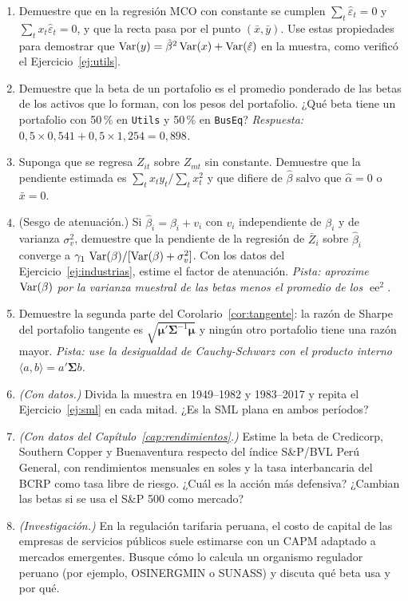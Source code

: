 \begin{enumerate}[label=\textbf{\thechapter.\arabic*},leftmargin=*,itemsep=6pt]
  \item Demuestre que en la regresión MCO con constante se cumplen $\sum_t\hat\varepsilon_t=0$ y
  $\sum_tx_t\hat\varepsilon_t=0$, y que la recta pasa por el punto $(\bar x,\bar y)$. Use estas propiedades
  para demostrar que $\operatorname{Var}(y)=\hat\beta^2\operatorname{Var}(x)+\operatorname{Var}(\hat\varepsilon)$ en la muestra, como verificó el
  Ejercicio~\ref{ej:utils}.

  \item Demuestre que la beta de un portafolio es el promedio ponderado de las betas de los activos que lo
  forman, con los pesos del portafolio. ¿Qué beta tiene un portafolio con 50\,\% en \texttt{Utils} y
  50\,\% en \texttt{BusEq}? \textit{Respuesta: $0{,}5\times0{,}541+0{,}5\times1{,}254=0{,}898$.}

  \item Suponga que se regresa $Z_{it}$ sobre $Z_{mt}$ sin constante. Demuestre que la pendiente estimada es
  $\sum_tx_ty_t/\sum_tx_t^2$ y que difiere de $\hat\beta$ salvo que $\hat\alpha=0$ o $\bar x=0$.

  \item (Sesgo de atenuación.) Si $\hat\beta_i=\beta_i+v_i$ con $v_i$ independiente de $\beta_i$ y de varianza
  $\sigma^2_v$, demuestre que la pendiente de la regresión de $\bar Z_i$ sobre $\hat\beta_i$ converge a
  $\gamma_1\,\operatorname{Var}(\beta)/[\operatorname{Var}(\beta)+\sigma^2_v]$. Con los datos del Ejercicio~\ref{ej:industrias},
  estime el factor de atenuación. \textit{Pista: aproxime $\operatorname{Var}(\beta)$ por la varianza muestral de las
  betas menos el promedio de los $\operatorname{ee}^2$.}

  \item Demuestre la segunda parte del Corolario~\ref{cor:tangente}: la razón de Sharpe del portafolio
  tangente es $\sqrt{\bm\mu'\bm\Sigma^{-1}\bm\mu}$ y ningún otro portafolio tiene una razón mayor.
  \textit{Pista: use la desigualdad de Cauchy-Schwarz con el producto interno $\langle a,b\rangle=a'\bm\Sigma b$.}

  \item \emph{(Con datos.)} Divida la muestra en 1949--1982 y 1983--2017 y repita el
  Ejercicio~\ref{ej:sml} en cada mitad. ¿Es la SML plana en ambos períodos?

  \item \emph{(Con datos del Capítulo~\ref{cap:rendimientos}.)} Estime la beta de Credicorp, Southern Copper
  y Buenaventura respecto del índice S\&P/BVL Perú General, con rendimientos mensuales en soles y la tasa
  interbancaria del BCRP como tasa libre de riesgo. ¿Cuál es la acción más defensiva? ¿Cambian las betas
  si se usa el S\&P 500 como mercado?

  \item \emph{(Investigación.)} En la regulación tarifaria peruana, el costo de capital de las empresas de
  servicios públicos suele estimarse con un CAPM adaptado a mercados emergentes. Busque cómo lo calcula
  un organismo regulador peruano (por ejemplo, OSINERGMIN o SUNASS) y discuta qué beta usa y por qué.
\end{enumerate}

